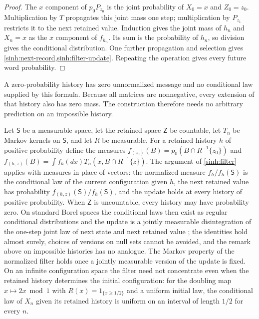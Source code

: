 \begin{proof}
The $x$ component of $p_0P_{z_0}$ is the joint probability of
$X_0=x$ and $Z_0=z_0$. Multiplication by $T$ propagates this joint mass
one step; multiplication by $P_{z_1}$ restricts it to the next retained
value. Induction gives the joint mass of $h_n$ and $X_n=x$ as the $x$
component of $f_{h_n}$. Its sum is the probability of $h_n$, so division
gives the conditional distribution. One further propagation and selection
gives \cref{sinh:next-record,sinh:filter-update}. Repeating
the operation gives every future word probability.
\end{proof}

A zero-probability history has zero unnormalized message and no conditional
law supplied by this formula. Because all matrices are nonnegative, every
extension of that history also has zero mass. The construction therefore
needs no arbitrary prediction on an impossible history.

Let $\mathsf S$ be a measurable space, let the retained space $\mathsf Z$ be
countable, let $T_n$ be Markov kernels on $\mathsf S$, and let $R$ be
measurable. For a retained history $h$ of positive probability define the
measures $f_{(z_0)}(B)=p_0(B\cap R^{-1}\{z_0\})$ and
$f_{(h,z)}(B)=\int f_h(dx)T_n(x,B\cap R^{-1}\{z\})$. The argument of
\cref{sinh:filter} applies with measures in place of vectors: the normalized
measure $f_h/f_h(\mathsf S)$ is the conditional law of the current
configuration given $h$, the next retained value has probability
$f_{(h,z)}(\mathsf S)/f_h(\mathsf S)$, and the update holds at every history
of positive probability. When $\mathsf Z$ is uncountable, every history may
have probability zero. On standard Borel spaces the conditional laws then
exist as regular conditional distributions and the update is a jointly
measurable disintegration of the one-step joint law of next state and next
retained value \citep{Kallenberg2021}; the identities hold almost surely,
choices of versions on null sets cannot be avoided, and the remark above on
impossible histories has no analogue. The Markov property of the normalized
filter holds once a jointly measurable version of the update is fixed. On an
infinite configuration space the filter need not concentrate even when the
retained history determines the initial configuration: for the doubling map
$x\mapsto2x\bmod1$ with $R(x)=1_{\{x\geq1/2\}}$ and a uniform initial law,
the conditional law of $X_n$ given its retained history is uniform on an
interval of length $1/2$ for every $n$.

